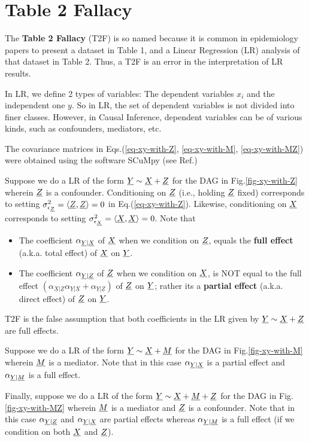 \chapter{Table 2 Fallacy}
\label{ch-table-2-fallacy}
The {\bf Table 2 Fallacy} (T2F) is so named
because it is common in epidemiology papers
to present a dataset in Table 1, 
and a Linear Regression (LR) analysis of that dataset in Table 2.
Thus, a T2F is an error in the interpretation of LR results.

In LR, we define 2 types of variables:
The dependent variables $x_i$
and the  independent one $y$. So
in LR, the set of dependent variables is  
not divided into finer classes. However, in Causal Inference,
dependent variables can be of various kinds, such as confounders, mediators, etc.


The covariance matrices in Eqs.(\ref{eq-xy-with-Z}, \ref{eq-xy-with-M}, \ref{eq-xy-with-MZ}) were obtained
using the software SCuMpy (see Ref.\cite{scumpy})

Suppose we do a LR of the form $\rvY \sim \rvX + \rvZ$
for the DAG in Fig.\ref{fig-xy-with-Z}
wherein $\rvZ$ is a confounder.
Conditioning on $\rvZ$
(i.e., holding $\rvZ$ fixed) corresponds to
setting $\s^2_{\eps_\rvZ}=\av{\rvZ, \rvZ}=0$ in Eq.(\ref{eq-xy-with-Z}).
Likewise, conditioning on $\rvX$ corresponds to
setting $\s^2_{\eps_\rvX}=\av{\rvX, \rvX}=0$.
Note that
\begin{itemize}
\item
The coefficient  $\alp_{\rvY|\rvX}$ of $\rvX$ when we condition on $\rvZ$, equals the {\bf full effect} (a.k.a. {total effect})
of $\rvX$ on $\rvY$.
\item
The coefficient $\alp_{\rvY|\rvZ}$ of $\rvZ$ when we condition on $\rvX$,
is NOT equal to the full effect 
$\left(\alpha_{\underline{X}|\underline{Z}} \alpha_{\underline{Y}|\underline{X}} + \alpha_{\underline{Y}|\underline{Z}}\right)$ of $\rvZ$ on $\rvY$;  rather its a {\bf partial effect} (a.k.a. {direct effect})
of $\rvZ$ on $\rvY$.
\end{itemize}
T2F is the false assumption that both
coefficients in the LR given by $\rvY\sim \rvX +\rvZ$
are full effects.

Suppose we do a LR of the form $\rvY \sim \rvX + \rvM$
for the DAG in Fig.\ref{fig-xy-with-M}
wherein $\rvM$ is a mediator.
Note that in this case $\alp_{\rvY|\rvX}$
is a partial effect and $\alp_{\rvY|\rvM}$ is a full effect.

Finally, suppose we do a LR of the form $\rvY \sim \rvX + \rvM +\rvZ$
for the DAG in Fig.\ref{fig-xy-with-MZ}
wherein $\rvM$ is a mediator and $\rvZ$ is a confounder.
Note that in this case $\alp_{\rvY|\rvZ}$ and
$\alp_{\rvY|\rvX}$ are partial effects whereas $\alp_{\rvY|\rvM}$ is a full effect (if we condition on both $\rvX$ and $\rvZ$).

